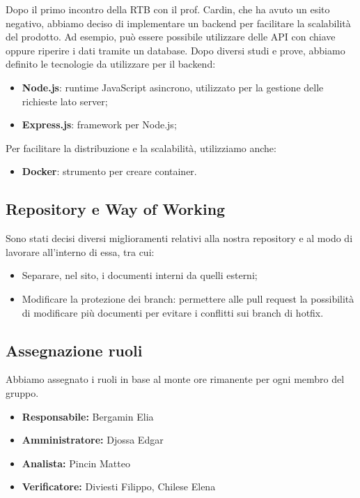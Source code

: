 Dopo il primo incontro della RTB con il prof. Cardin, che ha avuto un esito negativo, abbiamo deciso di implementare un backend per facilitare la scalabilità del prodotto. Ad esempio, può essere possibile utilizzare delle API con chiave oppure riperire i dati tramite un database. Dopo diversi studi e prove, abbiamo definito le tecnologie da utilizzare per il backend:

\begin{itemize}
\item \textbf{Node.js}: runtime JavaScript asincrono, utilizzato per la gestione delle richieste lato server;
\item \textbf{Express.js}: framework per Node.js;
\end{itemize}

Per facilitare la distribuzione e la scalabilità, utilizziamo anche:

\begin{itemize}
\item \textbf{Docker}: strumento per creare container.
\end{itemize}

\subsection{Repository e Way of Working}
Sono stati decisi diversi miglioramenti relativi alla nostra repository e al modo di lavorare all'interno di essa, tra cui:
\begin{itemize}
    \item Separare, nel sito, i documenti interni da quelli esterni;
    \item Modificare la protezione dei branch: permettere alle pull request la possibilità di modificare più documenti per evitare i conflitti sui branch di hotfix.
\end{itemize}

\subsection{Assegnazione ruoli}
Abbiamo assegnato i ruoli in base al monte ore rimanente per ogni membro del gruppo.

\begin{itemize}
    \item \textbf{Responsabile:}  Bergamin Elia
    \item \textbf{Amministratore:} Djossa Edgar
    \item \textbf{Analista:} Pincin Matteo
    \item \textbf{Verificatore:} Diviesti Filippo,  Chilese Elena
\end{itemize}

